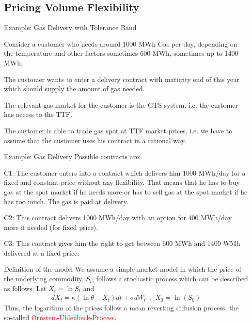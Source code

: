 
\subsection{Pricing Volume Flexibility}

{Example: Gas Delivery with Tolerance Band}






	Consider a customer who needs around 1000 MWh Gas per day, depending on the temperature and other factors sometimes 600 MWh, sometimes up to 1400 MWh.


	The customer wants to enter a delivery contract with maturity end of this year which should supply the amount of gas needed.


	The relevant gas market for the customer is the GTS system, i.e. the customer has access to the TTF.


	The customer is able to trade gas spot at TTF market prices, i.e. we have to assume that the customer uses his contract in a rational way.





{Example: Gas Delivery}
Possible contracts are:






	C1: The customer enters into a contract which delivers him 1000 MWh/day for a fixed and constant price without any flexibility. That means that he has to buy gas at the spot market if he needs more or has to sell gas at the spot market if he has too much. The gas is paid at delivery.


	C2: This contract delivers 1000 MWh/day with an option for 400 MWh/day more if needed (for fixed price).


	C3: This contract gives him the right to get between 600 MWh and 1400 WMh delivered at a fixed price.





{Definition of the model}
We assume a simple market model in which the price of the underlying commodity, $S_t$, follows a stochastic process which can be described as follows:
Let $X_t = \ln S_t$ and
\begin{align*}
	dX_t = \kappa (\ln \theta - X_t)dt + \sigma dW_t~~,~~X_0 = \ln(S_0)
\end{align*}
Thus, the logarithm of the prices follow a mean reverting diffusion process, the so-called \textcolor{red}{Ornstein-Uhlenbeck-Process}.\\


